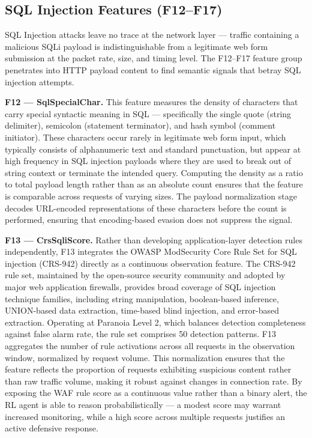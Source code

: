 \documentclass[12pt,a4paper]{report}
\begin{document}
\subsection{SQL Injection Features (F12--F17)}

SQL Injection attacks leave no trace at the network layer --- traffic containing a malicious SQLi payload is indistinguishable from a legitimate web form submission at the packet rate, size, and timing level. The F12--F17 feature group penetrates into HTTP payload content to find semantic signals that betray SQL injection attempts.

\textbf{F12 --- SqlSpecialChar.} This feature measures the density of characters that carry special syntactic meaning in SQL --- specifically the single quote (string delimiter), semicolon (statement terminator), and hash symbol (comment initiator). These characters occur rarely in legitimate web form input, which typically consists of alphanumeric text and standard punctuation, but appear at high frequency in SQL injection payloads where they are used to break out of string context or terminate the intended query. Computing the density as a ratio to total payload length rather than as an absolute count ensures that the feature is comparable across requests of varying sizes. The payload normalization stage decodes URL-encoded representations of these characters before the count is performed, ensuring that encoding-based evasion does not suppress the signal.

\textbf{F13 --- CrsSqliScore.} Rather than developing application-layer detection rules independently, F13 integrates the OWASP ModSecurity Core Rule Set for SQL injection (CRS-942) \cite{owaspModSecCRS} directly as a continuous observation feature. The CRS-942 rule set, maintained by the open-source security community and adopted by major web application firewalls, provides broad coverage of SQL injection technique families, including string manipulation, boolean-based inference, UNION-based data extraction, time-based blind injection, and error-based extraction. Operating at Paranoia Level 2, which balances detection completeness against false alarm rate, the rule set comprises 50 detection patterns. F13 aggregates the number of rule activations across all requests in the observation window, normalized by request volume. This normalization ensures that the feature reflects the proportion of requests exhibiting suspicious content rather than raw traffic volume, making it robust against changes in connection rate. By exposing the WAF rule score as a continuous value rather than a binary alert, the RL agent is able to reason probabilistically --- a modest score may warrant increased monitoring, while a high score across multiple requests justifies an active defensive response.
\end{document}
